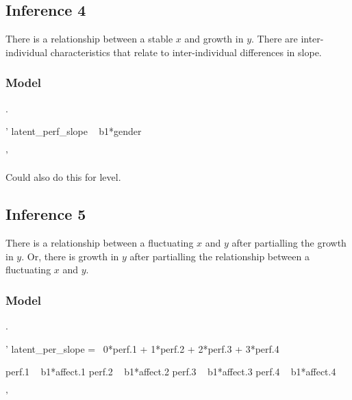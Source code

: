 \documentclass[english,,man]{apa6}
\newenvironment{Shaded}{\begin{snugshade}}{\end{snugshade}}
\newcommand{\StringTok}[1]{\textcolor[rgb]{0.31,0.60,0.02}{#1}}
\theoremstyle{definition}
\theoremstyle{definition}
\theoremstyle{definition}
\theoremstyle{remark}
\begin{document}
\hypertarget{inference-4}{%
\subsection{Inference 4}\label{inference-4}}

There is a relationship between a stable \(x\) and growth in \(y\).
There are inter-individual characteristics that relate to
inter-individual differences in slope.

\hypertarget{model-5}{%
\subsubsection{Model}\label{model-5}}

.

\begin{Shaded}
\begin{Highlighting}[]
\StringTok{'}
\StringTok{latent_perf_slope ~ b1*gender}

\StringTok{'}
\end{Highlighting}
\end{Shaded}

\noindent Could also do this for level.

\hypertarget{inference-5}{%
\subsection{Inference 5}\label{inference-5}}

There is a relationship between a fluctuating \(x\) and \(y\) after
partialling the growth in \(y\). Or, there is growth in \(y\) after
partialling the relationship between a fluctuating \(x\) and \(y\).

\hypertarget{model-6}{%
\subsubsection{Model}\label{model-6}}

.

\begin{Shaded}
\begin{Highlighting}[]
\StringTok{'}
\StringTok{latent_per_slope =~ 0*perf.1 + 1*perf.2 + 2*perf.3 + 3*perf.4}

\StringTok{perf.1 ~ b1*affect.1}
\StringTok{perf.2 ~ b1*affect.2}
\StringTok{perf.3 ~ b1*affect.3}
\StringTok{perf.4 ~ b1*affect.4}

\StringTok{'}
\end{Highlighting}
\end{Shaded}
\end{document}
